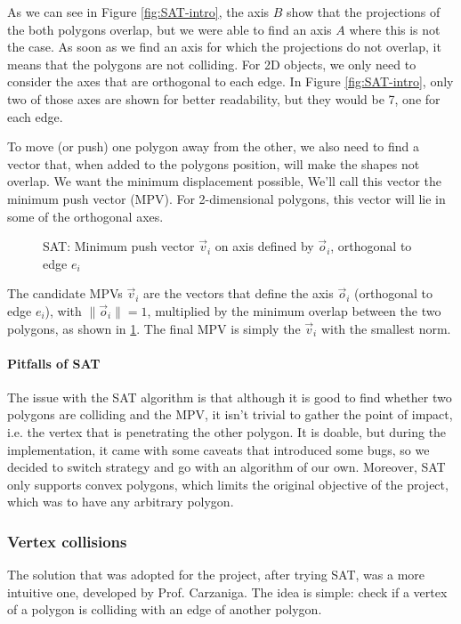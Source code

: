 As we can see in Figure \ref{fig:SAT-intro}, the axis $B$ show that the
projections of the both polygons overlap, but we were able to find an axis $A$
where this is not the case. As soon as we find an axis for which the projections
do not overlap, it means that the polygons are not colliding. For 2D objects, we
only need to consider the axes that are orthogonal to each edge. In Figure
\ref{fig:SAT-intro}, only two of those axes are shown for better readability,
but they would be 7, one for each edge.

To move (or push) one polygon away from the other, we also need to find a vector
that, when added to the polygons position, will make the shapes not overlap. We
want the minimum displacement possible, We'll call this vector the minimum push
vector (MPV). For 2-dimensional polygons, this vector will lie in some of the
orthogonal axes.

\begin{figure}[H]
	\centering
	\caption{SAT: Minimum push vector $\vec v_i$ on axis defined by $\vec o_i$,
		orthogonal to edge $e_i$}
	\label{fig:SAT-mpv}
\end{figure}

The candidate MPVs $\vec v_i$ are the vectors that define the axis $\vec o_i$
(orthogonal to edge $e_i$), with $\| \vec o_i \| = 1$, multiplied by the minimum
overlap between the two polygons, as shown in \ref{fig:SAT-mpv}. The final MPV
is simply the $\vec v_i$ with the smallest norm.

\paragraph{Pitfalls of SAT} The issue with the SAT algorithm is that although it
is good to find whether two polygons are colliding and the MPV, it isn't trivial
to gather the point of impact, i.e. the vertex that is penetrating the other
polygon. It is doable, but during the implementation, it came with some caveats
that introduced some bugs, so we decided to switch strategy and go with an
algorithm of our own. Moreover, SAT only supports convex polygons, which limits
the original objective of the project, which was to have any arbitrary polygon.

\subsubsection{Vertex collisions}
\label{sub:vertex-collision}

The solution that was adopted for the project, after trying SAT, was a more
intuitive one, developed by Prof. Carzaniga. The idea is simple: check if a
vertex of a polygon is colliding with an edge of another polygon.

